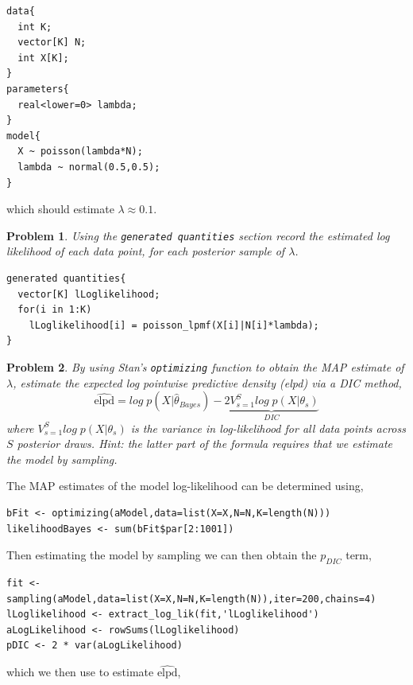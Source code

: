 \documentclass{article}
\newtheorem{problem}{Problem}[section]
\begin{document}
\begin{verbatim}
data{
  int K;
  vector[K] N;
  int X[K];
}
parameters{
  real<lower=0> lambda;
}
model{
  X ~ poisson(lambda*N);
  lambda ~ normal(0.5,0.5);
}
\end{verbatim}

which should estimate $\lambda\approx 0.1$.

\begin{problem}
	Using the \texttt{generated quantities} section record the estimated log likelihood of each data point, for each posterior sample of $\lambda$.
\end{problem}

\begin{verbatim}
generated quantities{
  vector[K] lLoglikelihood;
  for(i in 1:K)
    lLoglikelihood[i] = poisson_lpmf(X[i]|N[i]*lambda);
}
\end{verbatim}

\begin{problem}
	By using Stan's \texttt{optimizing} function to obtain the MAP estimate of $\lambda$, estimate the expected log pointwise predictive density (elpd) via a DIC method,
	\begin{equation}
	\widehat{\text{elpd}} = log \;p(X|\hat{\theta}_{Bayes}) - \underbrace{2 V_{s=1}^{S}log\; p (X|\theta_s)}_{DIC}
	\end{equation}
	where $V_{s=1}^{S} log\; p (X|\theta_s)$ is the variance in log-likelihood for all data points across $S$ posterior draws. Hint: the latter part of the formula requires that we estimate the model by sampling.
\end{problem}

The MAP estimates of the model log-likelihood can be determined using,

\begin{verbatim}
bFit <- optimizing(aModel,data=list(X=X,N=N,K=length(N)))
likelihoodBayes <- sum(bFit$par[2:1001])
\end{verbatim}

Then estimating the model by sampling we can then obtain the $p_{DIC}$ term,

\begin{verbatim}
fit <- sampling(aModel,data=list(X=X,N=N,K=length(N)),iter=200,chains=4)
lLoglikelihood <- extract_log_lik(fit,'lLoglikelihood')
aLogLikelihood <- rowSums(lLoglikelihood)
pDIC <- 2 * var(aLogLikelihood)
\end{verbatim}

which we then use to estimate $\widehat{\text{elpd}}$,
\end{document}
